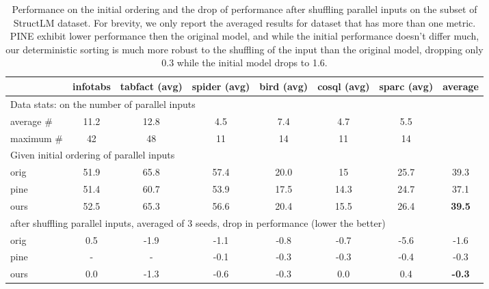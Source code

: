\begin{table*}[t]
\centering
\resizebox{0.85\textwidth}{!}
{
\begin{tabular}{@{}lccccccc@{}}
\toprule
\multicolumn{1}{l|}{}     & infotabs & tabfact (avg) & spider (avg) & bird (avg) & cosql (avg) & \multicolumn{1}{c|}{sparc (avg)} & average       \\ \midrule
\multicolumn{8}{l}{Data stats: on the number of parallel inputs}                                            \\ \midrule
\multicolumn{1}{l|}{average \#} & 11.2 & 12.8 & 4.5  & 7.4  & 4.7  & \multicolumn{1}{c|}{5.5}  &               \\
\multicolumn{1}{l|}{maximum \#} & 42   & 48   & 11   & 14   & 11   & \multicolumn{1}{c|}{14}   &               \\ \midrule
\multicolumn{8}{l}{Given initial ordering of parallel inputs}                                               \\ \midrule
\multicolumn{1}{l|}{orig}    & 51.9 & 65.8 & 57.4 & 20.0 & 15   & \multicolumn{1}{c|}{25.7} & 39.3          \\
\multicolumn{1}{l|}{pine}    & 51.4 & 60.7 & 53.9 & 17.5 & 14.3 & \multicolumn{1}{c|}{24.7} & 37.1          \\
\multicolumn{1}{l|}{ours} & 52.5     & 65.3          & 56.6         & 20.4       & 15.5        & \multicolumn{1}{c|}{26.4}        & \textbf{39.5} \\ \midrule
\multicolumn{8}{l}{after shuffling parallel inputs, averaged of 3 seeds, drop in performance (lower the better)}               \\ \midrule
\multicolumn{1}{l|}{orig}    & 0.5  & -1.9 & -1.1 & -0.8 & -0.7 & \multicolumn{1}{c|}{-5.6} & -1.6          \\
\multicolumn{1}{l|}{pine}    & -  & -  & -0.1 & -0.3 & -0.3 & \multicolumn{1}{c|}{-0.4} & -0.3          \\
\multicolumn{1}{l|}{ours}    & 0.0  & -1.3 & -0.6 & -0.3 & 0.0    & \multicolumn{1}{c|}{0.4}  & \textbf{-0.3} \\ \bottomrule
\end{tabular}
}
\caption{Performance on the initial ordering and the drop of performance after shuffling parallel inputs on the subset of StructLM dataset. For brevity, we only report the averaged results for dataset that has more than one metric. PINE exhibit lower performance then the original model, and while the initial performance doesn't differ much, our deterministic sorting is much more robust to the shuffling of the input than the original model, dropping only 0.3 while the initial model drops to 1.6.}
\label{table/structlm_main}

\end{table*}
